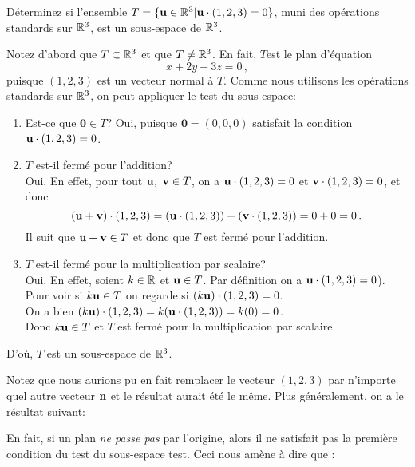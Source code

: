 \begin{myprob}
D\'eterminez si l'ensemble $T = \{ \mathbf{u} \in \mathbb{R}^3 | \mathbf{u} \cdot (1,2,3) = 0\}$, muni des
opérations standards sur $\mathbb{R}^3$,  est un sous-espace de $\mathbb{R}^3$.

\begin{mysol}
Notez d'abord que $T \subset \mathbb{R}^3$ et que $T \neq \mathbb{R}^3$. En fait, $T$est le
plan d'équation \[x + 2y + 3z= 0\,,\] puisque $(1,2,3)$ est un vecteur normal à $T$.
Comme nous utilisons les opérations standards sur $\mathbb{R}^3$, on peut appliquer le test du
sous-espace:

\begin{enumerate}
\item
  Est-ce que $\mathbf 0 \in T$? Oui, puisque $\mathbf 0 = (0,0,0)$
  satisfait la condition $\mathbf{u} \cdot (1,2,3) = 0$.
\item
  $T$ est-il fermé pour l'addition?\\
  Oui. En effet, pour tout $\mathbf{u},\ \mathbf{v}\in T$, on a $\mathbf{u} \cdot (1,2,3) = 0$ et $\mathbf{v} \cdot (1,2,3) = 0$, et donc
  $$(\mathbf{u} + \mathbf{v}) \cdot (1,2,3) = (\mathbf{u} \cdot (1,2,3)) + (\mathbf{v} \cdot (1,2,3)) = 0 + 0 = 0\,.$$
  Il suit que $\mathbf{u} + \mathbf{v} \in T$ et donc que $T$ est fermé pour
  l'addition.
\item
  $T$ est-il fermé pour la multiplication par scalaire?\\
 Oui. En effet, soient $k \in \mathbb{R}$ et $\mathbf{u} \in T$. Par définition on a $\mathbf{u} \cdot (1,2,3) = 0$).\\
  Pour voir si $k\mathbf{u} \in T$ on regarde si $(k\mathbf{u})\cdot (1,2,3) = 0$.\\
  On a bien
  $(k\mathbf{u})\cdot (1,2,3) = k(\mathbf{u} \cdot (1,2,3)) = k(0) = 0$.\\
  Donc $k\mathbf{u} \in T$ et $T$ est fermé pour la multiplication
 par scalaire.
\end{enumerate}

D'o\`u,  $T$ est un sous-espace de $\mathbb{R}^3$.

\end{mysol}

\end{myprob}

Notez que nous aurions pu en fait remplacer le vecteur $(1,2,3)$ par n'importe
quel autre vecteur $\mathbf{n}$ et le résultat aurait été le même. Plus généralement, on a le r\'esultat suivant:


En fait, si un plan \emph{ne passe pas} par l'origine, alors il ne satisfait pas la première condition du test du sous-espace test. Ceci nous amène à dire que :

